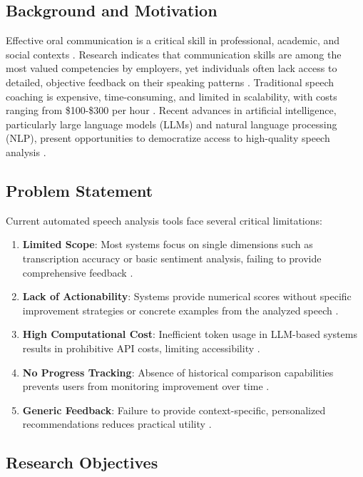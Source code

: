 \documentclass[conference]{IEEEtran}
\begin{document}
\subsection{Background and Motivation}

Effective oral communication is a critical skill in professional, academic, and social contexts \cite{robles2012executive}. Research indicates that communication skills are among the most valued competencies by employers, yet individuals often lack access to detailed, objective feedback on their speaking patterns \cite{hart2015falling}. Traditional speech coaching is expensive, time-consuming, and limited in scalability, with costs ranging from \$100-\$300 per hour \cite{nace2020job}. Recent advances in artificial intelligence, particularly large language models (LLMs) and natural language processing (NLP), present opportunities to democratize access to high-quality speech analysis \cite{brown2020language}.

\subsection{Problem Statement}

Current automated speech analysis tools face several critical limitations:

\begin{enumerate}
    \item \textbf{Limited Scope}: Most systems focus on single dimensions such as transcription accuracy or basic sentiment analysis, failing to provide comprehensive feedback \cite{pennebaker2015development}.
    \item \textbf{Lack of Actionability}: Systems provide numerical scores without specific improvement strategies or concrete examples from the analyzed speech \cite{chen2014towards}.
    \item \textbf{High Computational Cost}: Inefficient token usage in LLM-based systems results in prohibitive API costs, limiting accessibility \cite{openai2023gpt4}.
    \item \textbf{No Progress Tracking}: Absence of historical comparison capabilities prevents users from monitoring improvement over time \cite{tanveer2015rhema}.
    \item \textbf{Generic Feedback}: Failure to provide context-specific, personalized recommendations reduces practical utility \cite{chollet2015exploring}.
\end{enumerate}


\subsection{Research Objectives}
\end{document}
